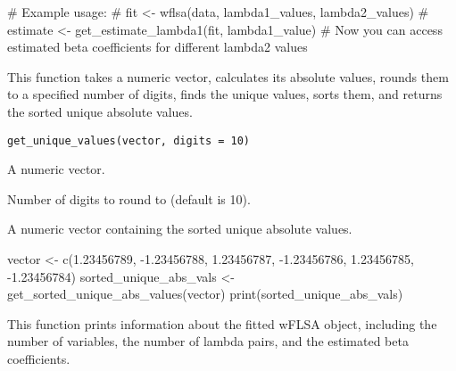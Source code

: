 \documentclass[a4paper]{book}
\begin{document}
%
\begin{Examples}
\begin{ExampleCode}
# Example usage:
# fit <- wflsa(data, lambda1_values, lambda2_values)
# estimate <- get_estimate_lambda1(fit, lambda1_value)
# Now you can access estimated beta coefficients for different lambda2 values
\end{ExampleCode}
\end{Examples}
%
\begin{Description}\relax
This function takes a numeric vector, calculates its absolute values,
rounds them to a specified number of digits, finds the unique values,
sorts them, and returns the sorted unique absolute values.
\end{Description}
%
\begin{Usage}
\begin{verbatim}
get_unique_values(vector, digits = 10)
\end{verbatim}
\end{Usage}
%
\begin{Arguments}
\begin{ldescription}
\item[\code{vector}] A numeric vector.

\item[\code{digits}] Number of digits to round to (default is 10).
\end{ldescription}
\end{Arguments}
%
\begin{Value}
A numeric vector containing the sorted unique absolute values.
\end{Value}
%
\begin{Examples}
\begin{ExampleCode}
vector <- c(1.23456789, -1.23456788, 1.23456787, -1.23456786, 1.23456785, -1.23456784)
sorted_unique_abs_vals <- get_sorted_unique_abs_values(vector)
print(sorted_unique_abs_vals)
\end{ExampleCode}
\end{Examples}
%
\begin{Description}\relax
This function prints information about the fitted wFLSA object, including the 
number of variables, the number of lambda pairs, and the estimated beta coefficients.
\end{Description}
\end{document}
